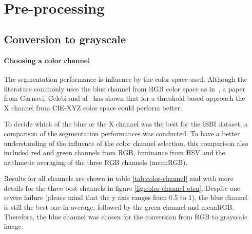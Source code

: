 \documentclass[a4paper,10pt]{article}
\begin{document}


\section{Pre-processing}
\subsection{Conversion to grayscale}

\paragraph{Choosing a color channel}

The segmentation performance is influence by the color space used. Although the literature commonly uses the blue channel from RGB color space as in~\cite{mendonca_comparison_2007}, a paper from Garnavi, Celebi and al~\cite{Garnavi2010} has shown that for a 
threshold-based approach the X channel from CIE-XYZ color space could perform better. 

To decide which of the blue or the X channel was the best for the ISBI dataset, a comparison of the segmentation performances was conducted. To have a better understanding of the influence of the color channel selection, this comparison also included red and green channels from RGB, luminance from HSV and the arithmetic averaging of the three RGB channels (meanRGB). 

Results for all channels are shown in table \ref{tab:color-channel} and with more details for the three best channels in figure \ref{fig:color-channel-otsu}. Despite one severe failure (please mind that the y axis ranges from 0.5 to 1), the blue channel is still the best one in average, followed by the green channel and meanRGB. Therefore, the blue channel was chosen for the conversion from RGB to grayscale image.
\paragraph{}
\end{document}
